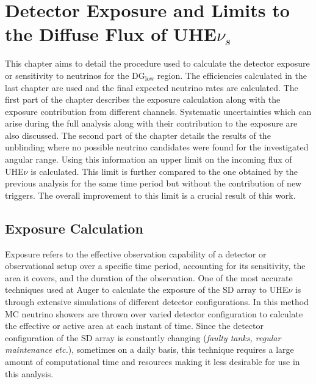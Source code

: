 
\chapter{Detector Exposure and Limits to the Diffuse Flux of UHE$\nu_s$}
\label{sec:align}
 
This chapter aims to detail the procedure used to calculate the detector exposure or sensitivity to neutrinos for the DG$\mathrm{_{\text{low}}}$ region. The efficiencies calculated in the last chapter are used and the final expected neutrino rates are calculated. The first part of the chapter describes the exposure calculation along with the exposure contribution from different channels. Systematic uncertainties which can arise during the full analysis along with their contribution to the exposure are also discussed. 
The second part of the chapter details the results of the unblinding where no possible neutrino candidates were found for the investigated angular range. Using this information an upper limit on the incoming flux of UHE$\nu$ is calculated. This limit is further compared to the one obtained by the previous analysis for the same time period but without the contribution of new triggers. The overall improvement to this limit is a crucial result of this work. 


\section{Exposure Calculation}
\label{sec:det_exposure_calc}

Exposure refers to the effective observation capability of a detector or observational setup over a specific time period, accounting for its sensitivity, the area it covers, and the duration of the observation. One of the most accurate techniques used at Auger to calculate the exposure of the SD array to UHE$\nu$ is through extensive simulations of different detector configurations. In this method MC neutrino showers are thrown over varied detector configuration to calculate the effective or active area at each instant of time. Since the detector configuration of the SD array is constantly changing (\textit{faulty tanks, regular maintenance etc.}), sometimes on a daily basis, this technique requires a large amount of computational time and resources making it less desirable for use in this analysis. 

